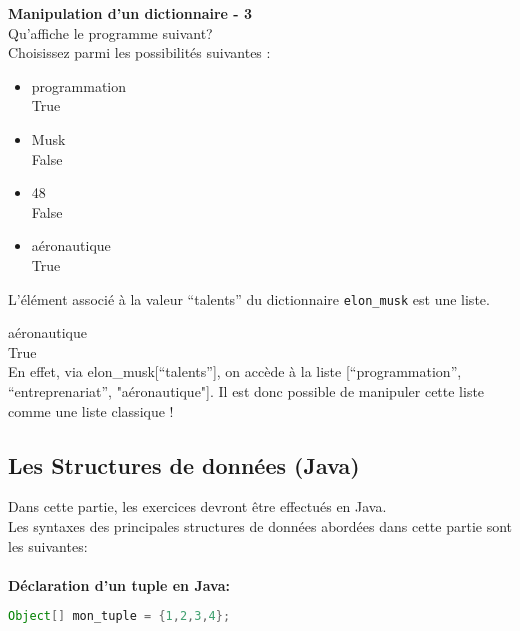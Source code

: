     \begin{Exercice}[5 minutes] \textbf{Manipulation d'un dictionnaire - 3}\\
      	Qu'affiche le programme suivant? \\
       
      	 
      	
      	Choisissez parmi les possibilités suivantes : \\
      	
      	\begin{itemize}
      	\item programmation \\
      	True\\
      	\item Musk \\
      	False\\
      	\item 48 \\
      	False\\
      	\item aéronautique \\
      	True
      	\end{itemize}
    
        \begin{conseil}
            L'élément associé à la valeur ``talents'' du dictionnaire \lstinline{elon_musk} est une liste.
        \end{conseil}
        
        \begin{solution}
            aéronautique \\
            True \\
            
            En effet, via elon\_musk[``talents''], on accède à la liste [``programmation'', ``entreprenariat'', "aéronautique"]. Il est donc possible de manipuler cette liste comme une liste classique !
        \end{solution}
    \end{Exercice}
    
    \subsection{Les Structures de données (Java)}
    Dans cette partie, les exercices devront être effectués en Java. \\
    Les syntaxes des principales structures de données abordées dans cette partie sont les suivantes: \\\\
    \textbf{Déclaration d'un tuple en Java:}
     \begin{lstlisting}[language=Java]
              Object[] mon_tuple = {1,2,3,4}; \end{lstlisting} 
              
